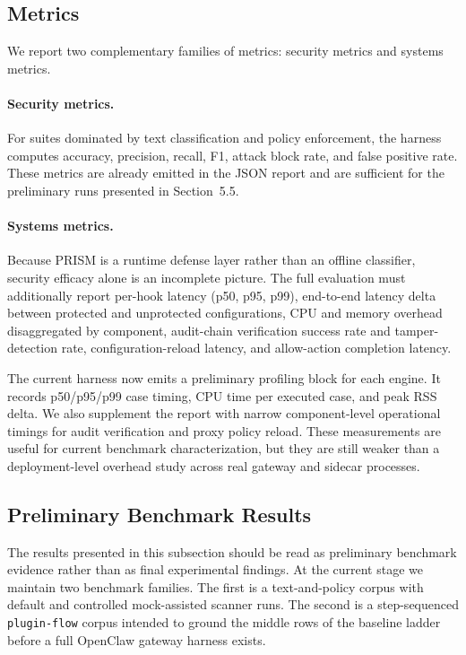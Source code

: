\subsection{Metrics}

We report two complementary families of metrics: security metrics and systems metrics.

\paragraph{Security metrics.} For suites dominated by text classification and policy enforcement, the harness computes accuracy, precision, recall, F1, attack block rate, and false positive rate. These metrics are already emitted in the JSON report and are sufficient for the preliminary runs presented in Section~5.5.

\paragraph{Systems metrics.} Because PRISM is a runtime defense layer rather than an offline classifier, security efficacy alone is an incomplete picture. The full evaluation must additionally report per-hook latency (p50, p95, p99), end-to-end latency delta between protected and unprotected configurations, CPU and memory overhead disaggregated by component, audit-chain verification success rate and tamper-detection rate, configuration-reload latency, and allow-action completion latency.

The current harness now emits a preliminary profiling block for each engine. It records p50/p95/p99 case timing, CPU time per executed case, and peak RSS delta. We also supplement the report with narrow component-level operational timings for audit verification and proxy policy reload. These measurements are useful for current benchmark characterization, but they are still weaker than a deployment-level overhead study across real gateway and sidecar processes.

\subsection{Preliminary Benchmark Results}

The results presented in this subsection should be read as preliminary benchmark evidence rather than as final experimental findings. At the current stage we maintain two benchmark families. The first is a text-and-policy corpus with default and controlled mock-assisted scanner runs. The second is a step-sequenced \texttt{plugin-flow} corpus intended to ground the middle rows of the baseline ladder before a full OpenClaw gateway harness exists.


